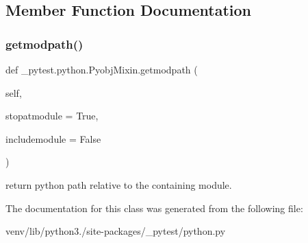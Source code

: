 \subsection{Member Function Documentation}
\mbox{\label{class__pytest_1_1python_1_1_pyobj_mixin_a0c86ecade728ecda3f0ea80681a8b50a}} 
\subsubsection{\texorpdfstring{getmodpath()}{getmodpath()}}
{\footnotesize\ttfamily def \+\_\+pytest.\+python.\+Pyobj\+Mixin.\+getmodpath (\begin{DoxyParamCaption}\item[{}]{self,  }\item[{}]{stopatmodule = {\ttfamily True},  }\item[{}]{includemodule = {\ttfamily False} }\end{DoxyParamCaption})}

\begin{DoxyVerb}return python path relative to the containing module. \end{DoxyVerb}
 

The documentation for this class was generated from the following file\+:\begin{DoxyCompactItemize}
\item 
venv/lib/python3./site-\/packages/\+\_\+pytest/python.\+py\end{DoxyCompactItemize}
